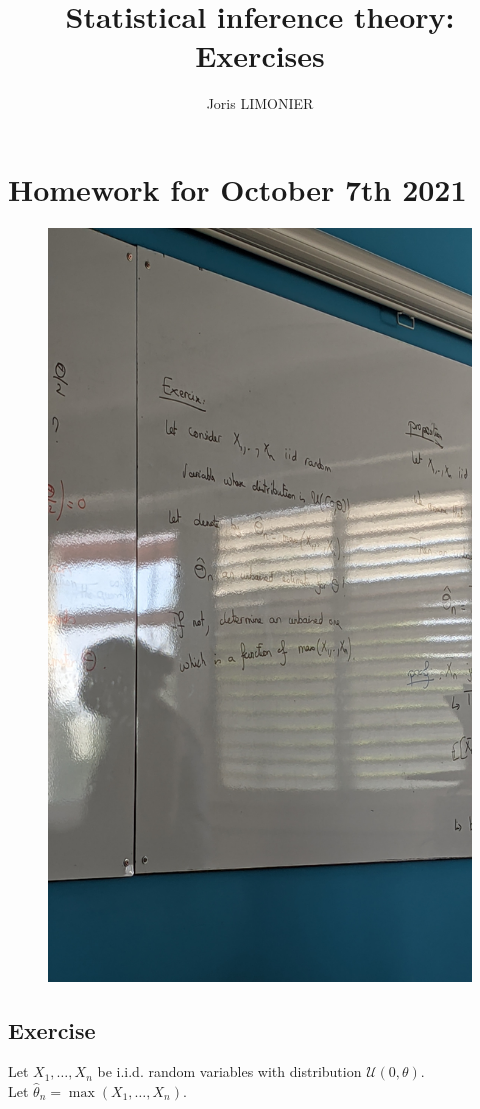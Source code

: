 \documentclass{article}
\title{Statistical inference theory: Exercises}
\author{Joris LIMONIER}
\begin{document}
\maketitle

\tableofcontents

\section{Homework for October 7th 2021}
\begin{figure}[h]
    \centering
    \includegraphics[angle=-90, width=.5\textwidth]{exercise.jpg}
\end{figure}
\subsection{Exercise}
Let \(X_1, \ldots, X_n\) be i.i.d. random variables with distribution \(\mathcal{U}(0, \theta)\). \\
Let \(\hat\theta_n = \max(X_1, \ldots, X_n)\).
\end{document}
